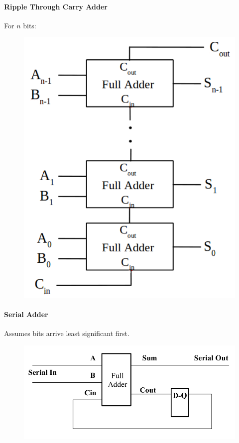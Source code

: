 \documentclass[twocolumn,english]{article}
\begin{document}
\paragraph{\noindent Ripple Through Carry Adder}

For $n$ bits:

\begin{figure}[H]
\noindent \centering{}\includegraphics[width=0.15\paperwidth]{img/ripplethroughadder}
\end{figure}



\paragraph{Serial Adder}

Assumes bits arrive least significant first.

\begin{figure}[H]
\noindent \centering{}\includegraphics[width=0.2\paperwidth]{img/serialadder}
\end{figure}
\end{document}
